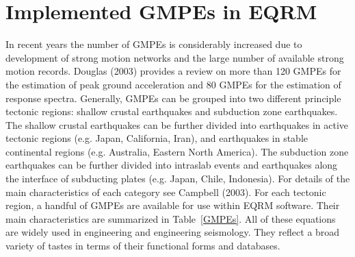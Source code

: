 \section{Implemented GMPEs in EQRM}\label{sec:implemented} In
recent years the number of GMPEs is considerably increased due to
development of strong motion networks and the large number of
available strong motion records. Douglas (2003) provides a review on
more than 120 GMPEs for the estimation of peak ground acceleration
and 80 GMPEs for the estimation of response spectra. Generally,
GMPEs can be grouped into two different principle tectonic regions:
shallow crustal earthquakes and subduction zone earthquakes. The
shallow crustal earthquakes can be further divided into earthquakes
in active tectonic regions (e.g. Japan, California, Iran), and
earthquakes in stable continental regions (e.g. Australia, Eastern
North America). The subduction zone earthquakes can be further
divided into intraslab events and earthquakes along the interface of
subducting plates (e.g. Japan, Chile, Indonesia). For details of the
main characteristics of each category see Campbell (2003). For each
tectonic region, a handful of GMPEs are available for use within
EQRM software. Their main characteristics are summarized in
Table~\ref{GMPEs}. All of these equations are widely used in
engineering and engineering seismology. They reflect a broad variety
of tastes in terms of their functional forms and databases.
